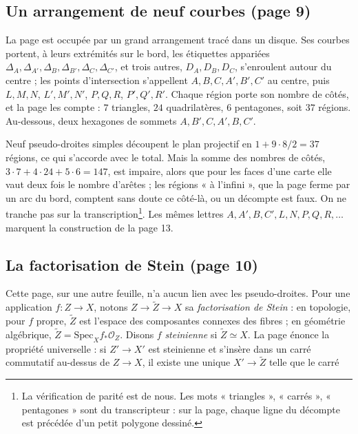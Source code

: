 \documentclass[11pt,a4paper]{article}
\begin{document}
\subsection*{Un arrangement de neuf courbes (page 9)}

La page est occupée par un grand arrangement tracé dans un disque. Ses
courbes portent, à leurs extrémités sur le bord, les étiquettes appariées
$\Delta_A, \Delta_{A'}, \Delta_B, \Delta_{B'}, \Delta_C, \Delta_{C'}$, et trois
autres, $D_A, D_B, D_C$, s'enroulent autour du centre ; les points
d'intersection s'appellent $A, B, C, A', B', C'$ au centre, puis $L, M, N$,
$L', M', N'$, $P, Q, R$, $P', Q', R'$. Chaque région porte son nombre de
côtés, et la page les compte : $7$ triangles, $24$ quadrilatères, $6$
pentagones, soit $37$ régions. Au-dessous, deux hexagones de sommets $A,
B', C, A', B, C'$.

Neuf pseudo-droites simples découpent le plan projectif en $1 + 9 \cdot 8 / 2
= 37$ régions, ce qui s'accorde avec le total. Mais la somme des nombres de
côtés, $3 \cdot 7 + 4 \cdot 24 + 5 \cdot 6 = 147$, est impaire, alors que pour
les faces d'une carte elle vaut deux fois le nombre d'arêtes ; les régions
« à l'infini », que la page ferme par un arc du bord, comptent sans doute ce
côté-là, ou un décompte est faux. On ne tranche pas sur la
transcription\footnote{La vérification de parité est de nous. Les mots
« triangles », « carrés », « pentagones » sont du transcripteur : sur la
page, chaque ligne du décompte est précédée d'un petit polygone dessiné.}.
Les mêmes lettres $A, A', B, C', L, N, P, Q, R, \ldots$ marquent la
construction de la page 13.

\subsection*{La factorisation de Stein (page 10)}

Cette page, sur une autre feuille, n'a aucun lien avec les pseudo-droites.
Pour une application $f : Z \to X$, notons $Z \to \widetilde{Z} \to X$ sa
\emph{factorisation de Stein} : en topologie, pour $f$ propre,
$\widetilde{Z}$ est l'espace des composantes connexes des fibres ; en
géométrie algébrique, $\widetilde{Z} = \mathrm{Spec}_X f_* \mathcal{O}_Z$.
Disons $f$ \emph{steinienne} si $\widetilde{Z} \simeq X$. La page énonce la
propriété universelle : si $Z' \to X'$ est steinienne et s'insère dans un
carré commutatif au-dessus de $Z \to X$, il existe une unique $X' \to
\widetilde{Z}$ telle que le carré
\end{document}

